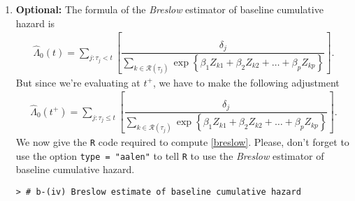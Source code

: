 \begin{enumerate}[(a)]
\begin{enumerate}
To get a visual picture of the survival curves predicted by \verb|survfit|, you can use the \verb|plot| function. However, you have to keep in mind that such curves are not raw KM probabilities, they are \textbf{fitted} curves that are subject to the proportional hazards assumption!
\begin{footnotesize}
\begin{verbatim}
> setwd("C:/Applied_Survival_Analysis_Jan2016/lab5/graphs")
> 
> pdf("nurshSurvEst.pdf",height = 6,width = 6)
> plot(surv.cox,mark.time = F,xlab = "Length of Stay of Resident (days)",
+      ylab = "Survival probability",lty = 1:4,
+      col = c("blue","red","green","orange"))
> legend("topright",lty = 1:4,col = c("blue","red","green","orange"),bty = "n",
+        legend = c("Single, healthy","Single, unhealthy","Married, healthy",
+                   "Married, unhealthy"))
\end{verbatim}
\end{footnotesize}
\begin{figure}[htbp]
	\centering
		\texttt{[image: nurshSurvEst.pdf]}
	\caption{Predicted survival curves for the Nursing Home Data.}
	\label{figure2}
\end{figure}
The subgroup of healthy single persons seems to have the longest length of stay. 
\newpage
\item \textbf{Optional:} The formula of the \emph{Breslow} estimator of baseline cumulative hazard is
\begin{align}
\hat{\Lambda}_{0}(t) = \sum_{j:\tau_{j}<t}\left[\dfrac{\delta_{j}}{\sum_{k\in \mathcal{R}(\tau_{j})}\exp\left\{\beta_{1}Z_{k1}+\beta_{2}Z_{k2}+\ldots+\beta_{p}Z_{kp}\right\}}
\right]. \nonumber
\end{align}
But since we're evaluating at $t^+$, we have to make the following adjustment
\begin{align}
\hat{\Lambda}_{0}(t^+) = \sum_{j:\tau_{j}\leq t}\left[\dfrac{\delta_{j}}{\sum_{k\in \mathcal{R}(\tau_{j})}\exp\left\{\beta_{1}Z_{k1}+\beta_{2}Z_{k2}+\ldots+\beta_{p}Z_{kp}\right\}}
\right]. \label{breslow}
\end{align}
We now give the \verb|R| code required to compute \eqref{breslow}. Please, don't forget to use the option \verb|type = "aalen"| to tell \verb|R| to use the \emph{Breslow} estimator of baseline cumulative hazard.
\begin{spacing}{1.1}
\begin{footnotesize}
\begin{verbatim}
> # b-(iv) Breslow estimate of baseline cumulative hazard

\end{verbatim}
\end{footnotesize}
\end{spacing}
\end{enumerate}
\end{enumerate}
